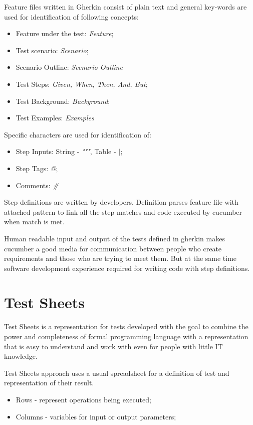 Feature files written in Gherkin consist of plain text and general key-words are used for identification of following concepts:
\begin{itemize}
	\item Feature under the test: \textit{Feature};
	\item Test scenario: \textit{Scenario};
	\item Scenario Outline: \textit{Scenario Outline}
	\item Test Steps: \textit{Given, When, Then, And, But};
	\item Test Background:  \textit{Background};
	\item Test Examples: \textit{Examples}
\end{itemize}

Specific characters are used for identification of:
\begin{itemize}
	\item Step Inputs: String - \textit{"""}, Table - \textit{$|$};
	\item Step Tags: \textit{@};
	\item Comments: \textit{\#}
\end{itemize}

Step definitions are written by developers. Definition parses feature file with attached pattern to link all the step matches and code executed by cucumber when match is met.

Human readable input and output of the tests defined in gherkin makes cucumber a good media for communication between people who create requirements and those who are trying to meet them. But at the same time software development experience required for writing code with step definitions.

\section{Test Sheets}
\label{sec:testSheets}
Test Sheets is a representation for tests developed with the goal to combine the power and completeness of formal programming language with a representation that is easy to understand and work with even for people with little IT knowledge\cite{ts}.

Test Sheets approach uses a usual spreadsheet for a definition of test and representation of their result. 
\begin{itemize}
	\item Rows - represent operations being executed;
	\item Columns -  variables for input or output parameters;
\end{itemize}

